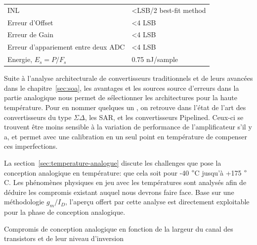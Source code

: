 \begin{mdframed}[linecolor=Prune,linewidth=1]
\begin{center}
\begin{tabular}{ll}
    INL                              & \textless LSB/2 best-fit method                                                                                                                             \\
    Erreur d'Offset                     & \textless 4 LSB                                                                                                                                             \\
    Erreur de Gain                       & \textless 4 LSB                                                                                                                                             \\
    Erreur d'appariement entre deux ADC      & \textless 4 LSB                                                                                                                                             \\
    Energie, $E_s = P/F_s$            & 0.75 nJ/sample      \\ \bottomrule                                                                                                                                       
    \end{tabular}
\end{center}

Suite à l’analyse architecturale de convertisseurs traditionnels et de leurs avancées dans le chapitre~\ref{sec:soa}, les avantages et les sources source d’erreurs dans la partie analogique nous permet de sélectionner les architectures pour la haute température. Pour en nommer quelques un , on retrouve dans l’état de l’art des convertisseurs du type \(\Sigma \Delta\), les SAR, et les convertisseurs Pipelined. Ceux-ci se trouvent être moins sensible à la variation de performance de l’amplificateur s'il y a, et permet avec une calibration en un seul point en température de compenser ces imperfections.

La section~\ref{sec:temperature-analogue} discute les challenges que pose la conception analogique en température: que cela soit pour -40 \(\degree\)C jusqu’à +175 \(\degree\)C. Les phénomènes physiques en jeu avec les températures sont analysés afin de déduire les compromis existant auquel nous devrons faire face.  Base sur une méthodologie \(g_m/I_D\), l’aperçu offert par cette analyse est directement exploitable pour la phase de conception analogique.

\begin{center}
    \centering
    
    \caption[]{Compromis de conception analogique en fonction de la largeur du canal des transistors et de leur niveau d'inversion}
    \label{fig:tradeoffs-fr}
\end{center}


\end{mdframed}
